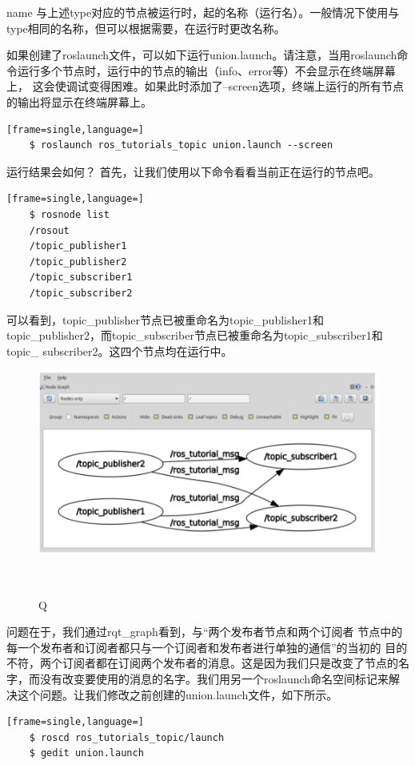 \documentclass[geye,green,kindle,cn]{elegantnote}
\begin{document}
name   与上述type对应的节点被运行时，起的名称（运行名）。一般情况下使用与type相同的名称，但可以根据需要，在运行时更改名称。 

如果创建了roslaunch文件，可以如下运行union.launch。请注意，当用roslaunch命令运行多个节点时，运行中的节点的输出（info、error等）不会显示在终端屏幕上， 这会使调试变得困难。如果此时添加了--screen选项，终端上运行的所有节点的输出将显示在终端屏幕上。 
\begin{lstlisting}[frame=single,language=]
    $ roslaunch ros_tutorials_topic union.launch --screen
\end{lstlisting}

运行结果会如何？ 首先，让我们使用以下命令看看当前正在运行的节点吧。 
\begin{lstlisting}[frame=single,language=]
    $ rosnode list 
    /rosout 
    /topic_publisher1 
    /topic_publisher2 
    /topic_subscriber1 
    /topic_subscriber2
\end{lstlisting}

可以看到，topic_publisher节点已被重命名为topic_publisher1和topic_publisher2，而topic_subscriber节点已被重命名为topic_subscriber1和topic_ subscriber2。这四个节点均在运行中。
\begin{figure}[htbp]
    \centering
    \includegraphics[width=1\linewidth]{src/Q.png}
    \centering
    \caption{Q} \label{picture:Q}
\end{figure}

问题在于，我们通过rqt_graph看到，与“两个发布者节点和两个订阅者 节点中的每一个发布者和订阅者都只与一个订阅者和发布者进行单独的通信”的当初的 目的不符，两个订阅者都在订阅两个发布者的消息。这是因为我们只是改变了节点的名 字，而没有改变要使用的消息的名字。我们用另一个roslaunch命名空间标记来解决这个问题。让我们修改之前创建的union.launch文件，如下所示。
\begin{lstlisting}[frame=single,language=]
    $ roscd ros_tutorials_topic/launch 
    $ gedit union.launch 
\end{lstlisting}
\end{document}
